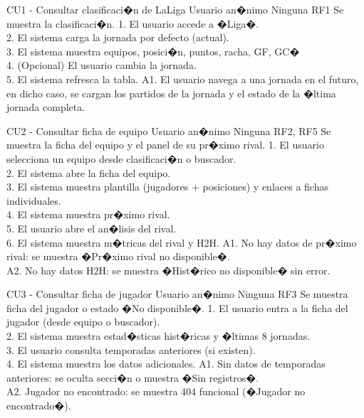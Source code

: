 \CUTable%
{CU1 - Consultar clasificaci�n de LaLiga}
{Usuario an�nimo}
{Ninguna}
{RF1}
{Se muestra la clasificaci�n.}
{1. El usuario accede a �Liga�.\\2. El sistema carga la jornada por defecto (actual).\\3. El sistema muestra equipos, posici�n, puntos, racha, GF, GC�\\4. (Opcional) El usuario cambia la jornada.\\5. El sistema refresca la tabla.}
{A1. El usuario navega a una jornada en el futuro, en dicho caso, se cargan los partidos de la jornada y el estado de la �ltima jornada completa.}

\CUTable%
{CU2 - Consultar ficha de equipo}
{Usuario an�nimo}
{Ninguna}
{RF2, RF5}
{Se muestra la ficha del equipo y el panel de su pr�ximo rival.}
{1. El usuario selecciona un equipo desde clasificaci�n o buscador.\\2. El sistema abre la ficha del equipo.\\3. El sistema muestra plantilla (jugadores + posiciones) y enlaces a fichas individuales.\\4. El sistema muestra pr�ximo rival.\\5. El usuario abre el an�lisis del rival.\\6. El sistema muestra m�tricas del rival y H2H.}
{A1. No hay datos de pr�ximo rival: se muestra �Pr�ximo rival no disponible�.\\A2. No hay datos H2H: se muestra �Hist�rico no disponible� sin error.}

\CUTable%
{CU3 - Consultar ficha de jugador}
{Usuario an�nimo}
{Ninguna}
{RF3}
{Se muestra ficha del jugador o estado �No disponible�.}
{1. El usuario entra a la ficha del jugador (desde equipo o buscador).\\2. El sistema muestra estad�sticas hist�ricas y �ltimas 8 jornadas.\\3. El usuario consulta temporadas anteriores (si existen).\\4. El sistema muestra los datos adicionales.}
{A1. Sin datos de temporadas anteriores: se oculta secci�n o muestra �Sin registros�.\\A2. Jugador no encontrado: se muestra 404 funcional (�Jugador no encontrado�).}

